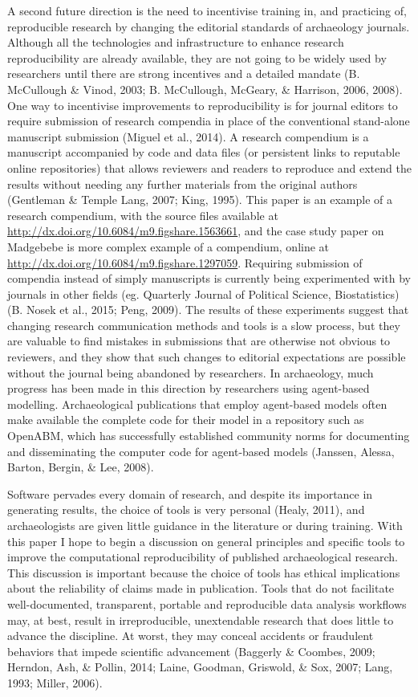\documentclass[american,man]{apa6}
\newcounter{author}
\begin{document}
A second future direction is the need to incentivise training in, and
practicing of, reproducible research by changing the editorial standards
of archaeology journals. Although all the technologies and
infrastructure to enhance research reproducibility are already
available, they are not going to be widely used by researchers until
there are strong incentives and a detailed mandate (B. {McCullough} \&
Vinod, 2003; B. {McCullough}, {McGeary}, \& Harrison, 2006, 2008). One
way to incentivise improvements to reproducibility is for journal
editors to require submission of research compendia in place of the
conventional stand-alone manuscript submission (Miguel et al., 2014). A
research compendium is a manuscript accompanied by code and data files
(or persistent links to reputable online repositories) that allows
reviewers and readers to reproduce and extend the results without
needing any further materials from the original authors (Gentleman \&
Temple Lang, 2007; King, 1995). This paper is an example of a research
compendium, with the source files available at
\url{http://dx.doi.org/10.6084/m9.figshare.1563661}, and the case study
paper on Madgebebe is more complex example of a compendium, online at
\url{http://dx.doi.org/10.6084/m9.figshare.1297059}. Requiring
submission of compendia instead of simply manuscripts is currently being
experimented with by journals in other fields (eg. Quarterly Journal of
Political Science, Biostatistics) (B. Nosek et al., 2015; Peng, 2009).
The results of these experiments suggest that changing research
communication methods and tools is a slow process, but they are valuable
to find mistakes in submissions that are otherwise not obvious to
reviewers, and they show that such changes to editorial expectations are
possible without the journal being abandoned by researchers. In
archaeology, much progress has been made in this direction by
researchers using agent-based modelling. Archaeological publications
that employ agent-based models often make available the complete code
for their model in a repository such as OpenABM, which has successfully
established community norms for documenting and disseminating the
computer code for agent-based models (Janssen, Alessa, Barton, Bergin,
\& Lee, 2008).

Software pervades every domain of research, and despite its importance
in generating results, the choice of tools is very personal (Healy,
2011), and archaeologists are given little guidance in the literature or
during training. With this paper I hope to begin a discussion on general
principles and specific tools to improve the computational
reproducibility of published archaeological research. This discussion is
important because the choice of tools has ethical implications about the
reliability of claims made in publication. Tools that do not facilitate
well-documented, transparent, portable and reproducible data analysis
workflows may, at best, result in irreproducible, unextendable research
that does little to advance the discipline. At worst, they may conceal
accidents or fraudulent behaviors that impede scientific advancement
(Baggerly \& Coombes, 2009; Herndon, Ash, \& Pollin, 2014; Laine,
Goodman, Griswold, \& Sox, 2007; Lang, 1993; Miller, 2006).
\end{document}
